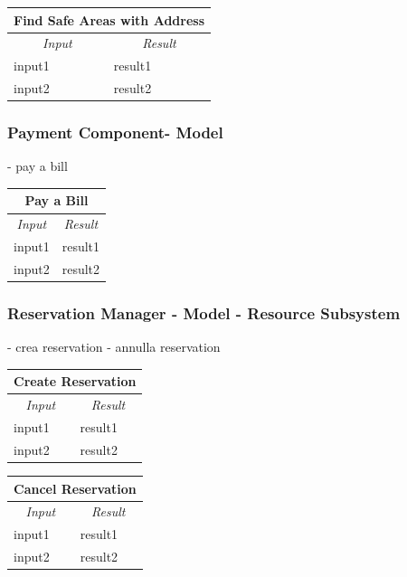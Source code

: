 \documentclass[english]{article}
\begin{document}
\begin{center}
	\begin{tabular}{ | m{6cm} | m{6cm} | }
		\hline 
		\multicolumn{2}{|c|}{\textbf{Find Safe Areas with Address}} \\
		\hline
		\multicolumn{1}{|c|}{\textit{Input}} & \multicolumn{1}{c|}{\textit{Result}} \\
		\hline
		input1 & result1 \\
		\hline
		input2 & result2 \\
		\hline
	\end{tabular}
\end{center}

\subsubsection{Payment Component- Model}
- pay a bill 

\begin{center}
	\begin{tabular}{ | m{6cm} | m{6cm} | }
		\hline 
		\multicolumn{2}{|c|}{\textbf{Pay a Bill}} \\
		\hline
		\multicolumn{1}{|c|}{\textit{Input}} & \multicolumn{1}{c|}{\textit{Result}} \\
		\hline
		input1 & result1 \\
		\hline
		input2 & result2 \\
		\hline
	\end{tabular}
\end{center}

\subsubsection{Reservation Manager - Model - Resource Subsystem}
- crea reservation
- annulla reservation

\begin{center}
	\begin{tabular}{ | m{6cm} | m{6cm} | }
		\hline 
		\multicolumn{2}{|c|}{\textbf{Create Reservation}} \\
		\hline
		\multicolumn{1}{|c|}{\textit{Input}} & \multicolumn{1}{c|}{\textit{Result}} \\
		\hline
		input1 & result1 \\
		\hline
		input2 & result2 \\
		\hline
	\end{tabular}
\end{center}

\begin{center}
	\begin{tabular}{ | m{6cm} | m{6cm} | }
		\hline 
		\multicolumn{2}{|c|}{\textbf{Cancel Reservation}} \\
		\hline
		\multicolumn{1}{|c|}{\textit{Input}} & \multicolumn{1}{c|}{\textit{Result}} \\
		\hline
		input1 & result1 \\
		\hline
		input2 & result2 \\
		\hline
	\end{tabular}
\end{center}
\end{document}
